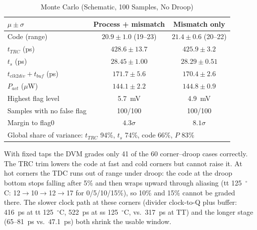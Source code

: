 \documentclass[conference]{IEEEtran}
\begin{document}
\begin{table}[!t]
\caption{Monte Carlo (Schematic, 100 Samples, No Droop)}
\label{tab:mc}
\centering\footnotesize
\setlength{\tabcolsep}{3pt}
\begin{tabular}{lcc}
\toprule
$\mu\pm\sigma$ & Process + mismatch & Mismatch only \\
\midrule
Code (range) & $20.9\pm1.0$ (19--23) & $21.4\pm0.6$ (20--22) \\
$t_{TRC}$ (ps) & $428.6\pm13.7$ & $425.9\pm3.2$ \\
$t_s$ (ps) & $28.45\pm1.00$ & $28.29\pm0.51$ \\
$t_{clk2div}+t_{buf}$ (ps) & $171.7\pm5.6$ & $170.4\pm2.6$ \\
$P_{act}$ ($\mu$W) & $144.1\pm2.2$ & $144.8\pm0.9$ \\
Highest flag level & 5.7~mV & 4.9~mV \\
Samples with no false flag & 100/100 & 100/100 \\
Margin to flag0 & $4.3\sigma$ & $8.1\sigma$ \\
\midrule
\multicolumn{3}{l}{Global share of variance: $t_{TRC}$ 94\%, $t_s$ 74\%, code 66\%, $P$ 83\%} \\
\bottomrule
\end{tabular}
\end{table}

With fixed taps the DVM grades only 41 of the 60 corner--droop cases correctly. The TRC trim lowers the code at fast and cold corners but cannot raise it. At hot corners the TDC runs out of range under droop: the code at the droop bottom stops falling after 5\% and then wraps upward through aliasing (tt 125~$^\circ$C: 12$\rightarrow$10$\rightarrow$12$\rightarrow$17 for 0/5/10/15\%), so 10\% and 15\% cannot be graded there. The slower clock path at these corners (divider clock-to-Q plus buffer: 416~ps at tt 125~$^\circ$C, 522~ps at ss 125~$^\circ$C, vs.\ 317~ps at TT) and the longer stage (65--81~ps vs.\ 47.1~ps) both shrink the usable window.
\end{document}
